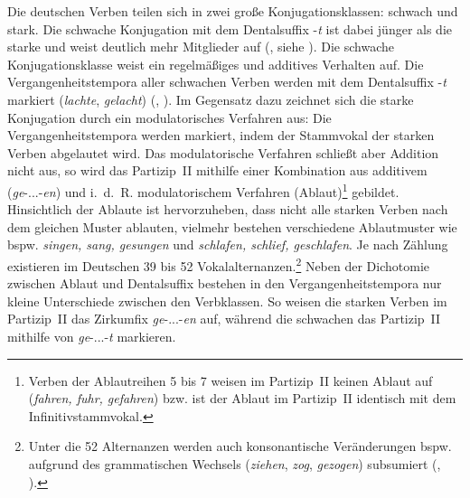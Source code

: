 Die deutschen Verben teilen sich in zwei große Konjugationsklassen: schwach und stark. Die schwache Konjugation mit dem Dentalsuffix -\textit{t} ist dabei jünger als die starke und weist deutlich mehr Mitglieder auf (\cite[111--112]{Szczepaniak.2011}, siehe ). Die schwache Konjugationsklasse weist ein regelmäßiges und additives Verhalten auf. Die Vergangenheitstempora aller schwachen Verben werden mit dem Dentalsuffix -\textit{t} markiert (\textit{lachte}, \textit{gelacht}) (\cite[54--55]{Bittner.1985}, \cite[178]{Nowak.2013}). Im Gegensatz dazu zeichnet sich die starke Konjugation durch ein modulatorisches Verfahren aus: Die Vergangenheitstempora werden markiert, indem der Stammvokal der starken Verben abgelautet wird. Das modulatorische Verfahren schließt aber Addition nicht aus, so wird das Partizip~II mithilfe einer Kombination aus additivem (\textit{ge}-...-\textit{en}) und i.~d.~R. modulatorischem Verfahren (Ablaut)\footnote{Verben der Ablautreihen 5 bis 7 weisen im Partizip~II keinen Ablaut auf (\textit{fahren, fuhr, gefahren}) bzw. ist der Ablaut im Partizip~II identisch mit dem Infinitivstammvokal.} gebildet. Hinsichtlich der Ablaute ist hervorzuheben, dass nicht alle starken Verben nach dem gleichen Muster ablauten, vielmehr bestehen verschiedene Ablautmuster wie bspw. \textit{singen, sang, gesungen} und \textit{schlafen, schlief, geschlafen}. Je nach Zählung existieren im Deutschen 39 bis 52 Vokalalternanzen.\footnote{Unter die 52 Alternanzen werden auch konsonantische Veränderungen bspw. aufgrund des grammatischen Wechsels  (\textit{ziehen}, \textit{zog}, \textit{gezogen}) subsumiert (\cite[192]{Nubling.1998}, \cite[13]{Dammel.2008}).}
Neben der Dichotomie zwischen Ablaut und Dentalsuffix bestehen in den Vergangenheitstempora nur kleine Unterschiede zwischen den Verbklassen. So weisen die starken Verben im Partizip~II das Zirkumfix \textit{ge}-...-\textit{en} auf, während die schwachen das Partizip~II mithilfe von \textit{ge}-...-\textit{t} markieren. 


